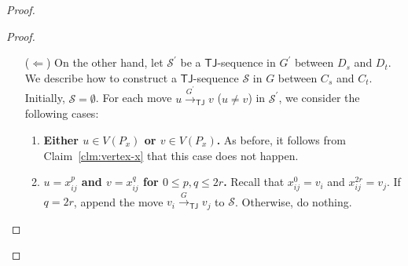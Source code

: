\documentclass[a4paper]{article}
\theoremstyle{plain}
\theoremstyle{definition}
\newcommand{\sfTJ}{{\mathsf{TJ}}} %
\newcommand{\sfR}{{\mathsf{R}}} %
\newcommand{\calS}{{\mathcal{S}}}
\newcommand{\reconf}[2][\sfR]{\overset{#2}{\longrightarrow}_{#1}} %
\begin{document}
\begin{proof}
\begin{proof}
\begin{itemize}
			\item[($\Leftarrow$)] On the other hand, let $\calS^\prime$ be a $\sfTJ$-sequence in $G^\prime$ between $D_s$ and $D_t$.
			We describe how to construct a $\sfTJ$-sequence $\calS$ in $G$ between $C_s$ and $C_t$.
			Initially, $\calS = \emptyset$.
			For each move $u \reconf[\sfTJ]{G^\prime} v$ ($u \neq v$) in $\calS^\prime$, we consider the following cases:
			\begin{enumerate}[{\bf {Case} 1:}]
				\item {\bf Either $u \in V(P_x)$ or $v \in V(P_x)$.} As before, it follows from Claim~\ref{clm:vertex-x} that this case does not happen.
				
				\item {\bf $u = x_{ij}^p$ and $v = x_{ij}^{q}$ for $0 \leq p, q \leq 2r$.} Recall that $x_{ij}^0 = v_i$ and $x_{ij}^{2r} = v_j$. 
				If $q = 2r$, append the move $v_i \reconf[\sfTJ]{G} v_j$ to $\calS$.
				Otherwise, do nothing.
				

\end{enumerate}
\end{itemize}
\end{proof}
\end{proof}
\end{document}
